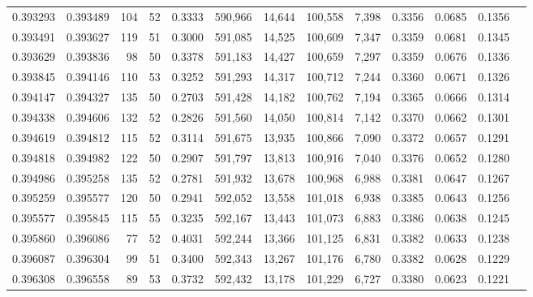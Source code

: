 \begin{tabular}{rrrrrrrrrrrrr}
0.393293 & 0.393489 &   104 &  52 &                                     0.3333 & 590,966 &  14,644 & 100,558 &   7,398 & 0.3356 & 0.0685 & 0.1356 \\
0.393491 & 0.393627 &   119 &  51 &                                     0.3000 & 591,085 &  14,525 & 100,609 &   7,347 & 0.3359 & 0.0681 & 0.1345 \\
0.393629 & 0.393836 &    98 &  50 &                                     0.3378 & 591,183 &  14,427 & 100,659 &   7,297 & 0.3359 & 0.0676 & 0.1336 \\
0.393845 & 0.394146 &   110 &  53 &                                     0.3252 & 591,293 &  14,317 & 100,712 &   7,244 & 0.3360 & 0.0671 & 0.1326 \\
0.394147 & 0.394327 &   135 &  50 &                                     0.2703 & 591,428 &  14,182 & 100,762 &   7,194 & 0.3365 & 0.0666 & 0.1314 \\
0.394338 & 0.394606 &   132 &  52 &                                     0.2826 & 591,560 &  14,050 & 100,814 &   7,142 & 0.3370 & 0.0662 & 0.1301 \\
0.394619 & 0.394812 &   115 &  52 &                                     0.3114 & 591,675 &  13,935 & 100,866 &   7,090 & 0.3372 & 0.0657 & 0.1291 \\
0.394818 & 0.394982 &   122 &  50 &                                     0.2907 & 591,797 &  13,813 & 100,916 &   7,040 & 0.3376 & 0.0652 & 0.1280 \\
0.394986 & 0.395258 &   135 &  52 &                                     0.2781 & 591,932 &  13,678 & 100,968 &   6,988 & 0.3381 & 0.0647 & 0.1267 \\
0.395259 & 0.395577 &   120 &  50 &                                     0.2941 & 592,052 &  13,558 & 101,018 &   6,938 & 0.3385 & 0.0643 & 0.1256 \\
0.395577 & 0.395845 &   115 &  55 &                                     0.3235 & 592,167 &  13,443 & 101,073 &   6,883 & 0.3386 & 0.0638 & 0.1245 \\
0.395860 & 0.396086 &    77 &  52 &                                     0.4031 & 592,244 &  13,366 & 101,125 &   6,831 & 0.3382 & 0.0633 & 0.1238 \\
0.396087 & 0.396304 &    99 &  51 &                                     0.3400 & 592,343 &  13,267 & 101,176 &   6,780 & 0.3382 & 0.0628 & 0.1229 \\
0.396308 & 0.396558 &    89 &  53 &                                     0.3732 & 592,432 &  13,178 & 101,229 &   6,727 & 0.3380 & 0.0623 & 0.1221 \\

\end{tabular}
